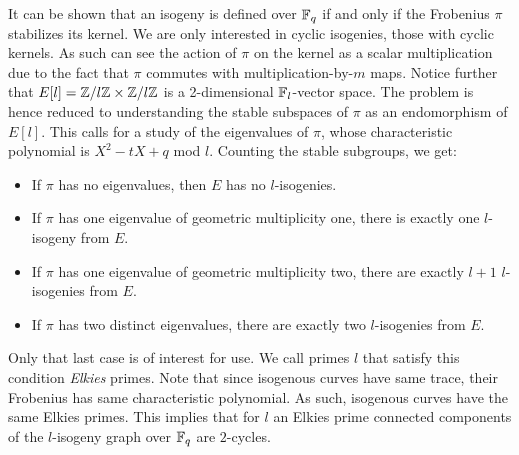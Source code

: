 \documentclass[../main/main.tex]{subfiles}
\begin{document}
It can be shown that an isogeny is defined over $\mathbb{F}_q$ if and only if the Frobenius $\pi$ stabilizes its kernel.
We are only interested in cyclic isogenies, those with cyclic kernels.
As such can see the action of $\pi$ on the kernel as a scalar multiplication due to the fact that $\pi$ commutes with multiplication-by-$m$ maps.
Notice further that $E[l] = \mathbb{Z}/l\mathbb{Z}\times\mathbb{Z}/l\mathbb{Z}$ is a 2-dimensional $\mathbb{F}_l$-vector space.
The problem is hence reduced to understanding the stable subspaces of $\pi$ as an endomorphism of $E[l]$.
This calls for a study of the eigenvalues of $\pi$, whose characteristic polynomial is $X^2-tX+q$ mod $l$.
Counting the stable subgroups, we get:
\begin{itemize}
	  \item If $\pi$ has no eigenvalues, then $E$ has no $l$-isogenies.
	  \item If $\pi$ has one eigenvalue of geometric multiplicity one, there is exactly one $l$-isogeny from $E$.
	  \item If $\pi$ has one eigenvalue of geometric multiplicity two, there are exactly $l+1$ $l$-isogenies from $E$.
	  \item If $\pi$ has two distinct eigenvalues, there are exactly two $l$-isogenies from $E$.
\end{itemize}
Only that last case is of interest for use.
We call primes $l$ that satisfy this condition \textit{Elkies} primes.
Note that since isogenous curves have same trace, their Frobenius has same characteristic polynomial.
As such, isogenous curves have the same Elkies primes.
This implies that for $l$ an Elkies prime connected components of the $l$-isogeny graph over $\mathbb{F}_q$ are $2$-cycles.
\end{document}
